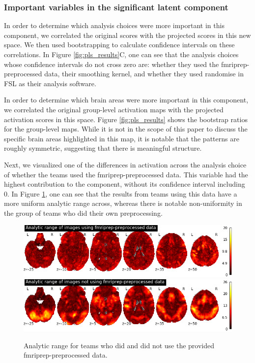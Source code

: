 \documentclass[a4paper,doc,natbib]{apa6}
\begin{document}
\subsubsection{Important variables in the significant latent component}
In order to determine which analysis choices were more important in this component, we correlated the original scores with the projected scores in this new space. We then used bootstrapping to calculate confidence intervals on these correlations. In Figure \ref{fig:pls_results}C, one can see that the analysis choices whose confidence intervals do not cross zero are: whether they used the fmriprep-preprocessed data, their smoothing kernel, and whether they used randomise in FSL as their analysis software. 

In order to determine which brain areas were more important in this component, we correlated the original group-level activation maps with the projected activation scores in this space. Figure \ref{fig:pls_results} shows the bootstrap ratios for the group-level maps. While it is not in the scope of this paper to discuss the specific brain areas highlighted in this map, it is notable that the patterns are roughly symmetric, suggesting that there is meaningful structure. 

Next, we visualized one of the differences in activation across the analysis choice of whether the teams used the fmriprep-preprocessed data. This variable had the highest contribution to the component, without its confidence interval including 0. In Figure \ref{fig:fmriprep}, one can see that the results from teams using this data have a more uniform analytic range across, whereas there is notable non-uniformity in the group of teams who did their own preprocessing. 

\begin{figure}[!htb]
	\includegraphics[width=\textwidth]
	{figures/results1B_hypo1_Analytic-range-of-images-using-fmriprep-preprocessed-data.png}
	\includegraphics[width=\textwidth]
	{figures/results1B_hypo1_Analytic-range-of-images-not-using-fmriprep-preprocessed-data.png}
	\caption{\label{fig:fmriprep} Analytic range for teams who did and did not use the provided fmriprep-preprocessed data.}
\end{figure}
	
\end{document}
